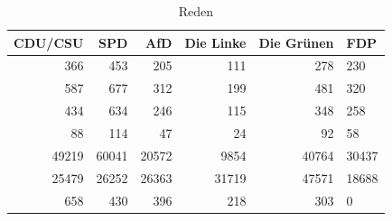\begin{table}
\caption{Reden}
\label{tab:meine_tabelle}
\begin{tabular}{rrrrrl}
\toprule
CDU/CSU & SPD & AfD & Die Linke & Die Grünen & FDP \\
\midrule
366 & 453 & 205 & 111 & 278 & 230 \\
587 & 677 & 312 & 199 & 481 & 320 \\
434 & 634 & 246 & 115 & 348 & 258 \\
88 & 114 & 47 & 24 & 92 & 58 \\
49219 & 60041 & 20572 & 9854 & 40764 & 30437 \\
25479 & 26252 & 26363 & 31719 & 47571 & 18688 \\
658 & 430 & 396 & 218 & 303 & 0 \\
\bottomrule
\end{tabular}
\end{table}
